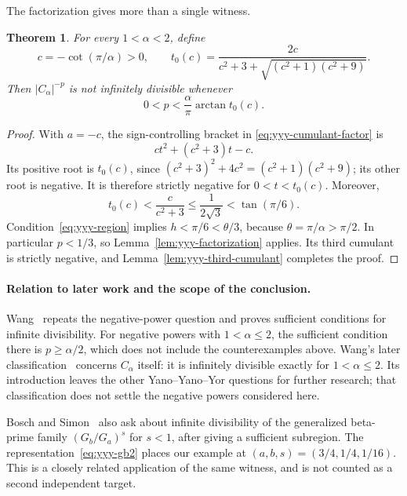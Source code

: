 \documentclass[11pt,a4paper]{article}
\newtheorem{theorem}{Theorem}[section]
\theoremstyle{definition}
\theoremstyle{remark}
\numberwithin{equation}{section}
\begin{document}
The factorization gives more than a single witness.

\begin{theorem}
\label{thm:yyy-region}
For every $1<\alpha<2$, define
\[
 c=-\cot(\pi/\alpha)>0,\qquad
 t_0(c)=\frac{2c}
 {c^2+3+\sqrt{(c^2+1)(c^2+9)}}.
\]
Then $|C_\alpha|^{-p}$ is not infinitely divisible whenever
\begin{equation}
 0<p<\frac{\alpha}{\pi}\arctan t_0(c).
 \label{eq:yyy-region}
\end{equation}
\end{theorem}

\begin{proof}
With $a=-c$, the sign-controlling bracket in
\eqref{eq:yyy-cumulant-factor} is
\[
 ct^2+(c^2+3)t-c.
\]
Its positive root is $t_0(c)$, since
$(c^2+3)^2+4c^2=(c^2+1)(c^2+9)$; its other root is negative.
It is therefore strictly negative for $0<t<t_0(c)$.
Moreover,
\[
 t_0(c)<\frac{c}{c^2+3}
 \le\frac1{2\sqrt3}<\tan(\pi/6).
\]
Condition~\eqref{eq:yyy-region} implies
$h<\pi/6<\theta/3$, because $\theta=\pi/\alpha>\pi/2$.
In particular $p<1/3$, so Lemma~\ref{lem:yyy-factorization} applies.
Its third cumulant is strictly negative, and
Lemma~\ref{lem:yyy-third-cumulant} completes the proof.
\end{proof}

\paragraph{Relation to later work and the scope of the conclusion.}
Wang~\cite[Section~1.3]{Wang2024} repeats the negative-power question
and proves sufficient conditions for infinite divisibility. For negative
powers with $1<\alpha\le2$, the sufficient condition there is
$p\ge\alpha/2$, which does not include the counterexamples above.
Wang's later classification~\cite{Wang2026} concerns $C_\alpha$ itself:
it is infinitely divisible exactly for $1<\alpha\le2$. Its introduction
leaves the other Yano--Yano--Yor questions for further research; that
classification does not settle the negative powers considered here.

Bosch and Simon~\cite[final paragraph]{BoschSimon2015} also ask about
infinite divisibility of the generalized beta-prime family
$(G_b/G_a)^s$ for $s<1$, after giving a sufficient subregion.
The representation~\eqref{eq:yyy-gb2} places our example at
$(a,b,s)=(3/4,1/4,1/16)$. This is a closely related application of the
same witness, and is not counted as a second independent target.
\end{document}
